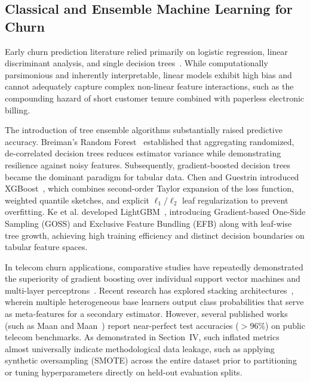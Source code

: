 \documentclass[conference]{IEEEtran}
\begin{document}
\subsection{Classical and Ensemble Machine Learning for Churn}
Early churn prediction literature relied primarily on logistic regression, linear discriminant analysis, and single decision trees~\cite{verbeke2012new}. While computationally parsimonious and inherently interpretable, linear models exhibit high bias and cannot adequately capture complex non-linear feature interactions, such as the compounding hazard of short customer tenure combined with paperless electronic billing.

The introduction of tree ensemble algorithms substantially raised predictive accuracy. Breiman's Random Forest~\cite{breiman2001random} established that aggregating randomized, de-correlated decision trees reduces estimator variance while demonstrating resilience against noisy features. Subsequently, gradient-boosted decision trees became the dominant paradigm for tabular data. Chen and Guestrin introduced XGBoost~\cite{chen2016xgboost}, which combines second-order Taylor expansion of the loss function, weighted quantile sketches, and explicit $\ell_1/\ell_2$ leaf regularization to prevent overfitting. Ke et al. developed LightGBM~\cite{ke2017lightgbm}, introducing Gradient-based One-Side Sampling (GOSS) and Exclusive Feature Bundling (EFB) along with leaf-wise tree growth, achieving high training efficiency and distinct decision boundaries on tabular feature spaces.

In telecom churn applications, comparative studies have repeatedly demonstrated the superiority of gradient boosting over individual support vector machines and multi-layer perceptrons~\cite{amin2019customer, ullah2019churn}. Recent research has explored stacking architectures~\cite{wolpert1992stacked}, wherein multiple heterogeneous base learners output class probabilities that serve as meta-features for a secondary estimator. However, several published works (such as Maan and Maan~\cite{maan2023churn}) report near-perfect test accuracies ($>96\%$) on public telecom benchmarks. As demonstrated in Section~IV, such inflated metrics almost universally indicate methodological data leakage, such as applying synthetic oversampling (SMOTE) across the entire dataset prior to partitioning or tuning hyperparameters directly on held-out evaluation splits.
\end{document}
